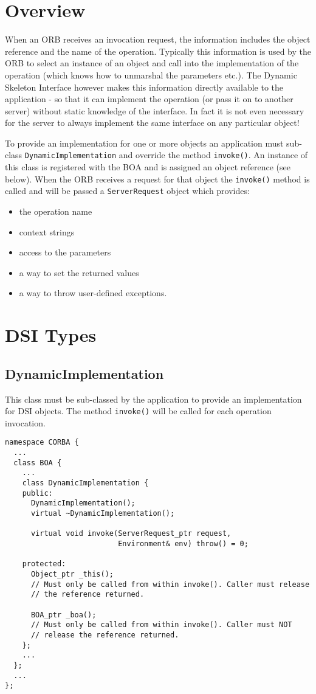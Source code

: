 \documentclass[11pt,twoside,onecolumn]{book}
\begin{document}
\section{Overview}

When an ORB receives an invocation request, the information includes
the object reference and the name of the operation. Typically this information
is used by the
ORB to select an instance of an object and call into the implementation of
the operation (which knows how to unmarshal the parameters etc.).
The Dynamic Skeleton Interface however makes this
information directly available to the application - so that it can
implement the operation (or pass it on to another server) without static
knowledge of the interface. In fact it is not even necessary for the server
to always implement the same interface on any particular object!

To provide an implementation for one or more objects an application must
sub-class {\tt DynamicImplementation} and override the method {\tt invoke()}.
An instance of this class is registered with the BOA and is assigned an
object reference (see below). When the ORB receives a request for that
object the {\tt invoke()} method is called and will be passed a
{\tt ServerRequest} object which provides:
\begin{itemize}
\item the operation name
\item context strings
\item access to the parameters
\item a way to set the returned values
\item a way to throw user-defined exceptions.
\end{itemize}


\section{DSI Types}

\subsection{DynamicImplementation}

This class must be sub-classed by the application to provide an implementation
for DSI objects. The method {\tt invoke()} will be called for each operation
invocation.

{\small \begin{verbatim}
namespace CORBA {
  ...
  class BOA {
    ...
    class DynamicImplementation {
    public:
      DynamicImplementation();
      virtual ~DynamicImplementation();

      virtual void invoke(ServerRequest_ptr request,
                          Environment& env) throw() = 0;

    protected:
      Object_ptr _this();
      // Must only be called from within invoke(). Caller must release
      // the reference returned.

      BOA_ptr _boa();
      // Must only be called from within invoke(). Caller must NOT
      // release the reference returned.
    };
    ...
  };
  ...
};
\end{verbatim}}
\end{document}
